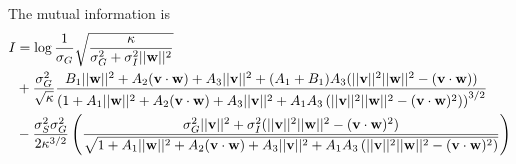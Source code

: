 \documentclass[11pt]{article}
\begin{document}
The mutual information is
\begin{align}
	I &= \log \frac{1}{\sigma_G} \sqrt{\frac{\kappa}{\sigma_G^2 + \sigma_I^2 ||\mathbf{w}||^2}} \notag \\
	&+ \frac{\sigma_G^2}{\sqrt{\kappa}} \frac{B_1 ||\mathbf{w}||^2 + A_2 (\mathbf{v}\cdot\mathbf{w}) + A_3 ||\mathbf{v}||^2 + (A_1 + B_1) A_3 (||\mathbf{v}||^2 ||\mathbf{w}||^2 - (\mathbf{v}\cdot\mathbf{w}))}{\left(1 + A_1 ||\mathbf{w}||^2 + A_2 (\mathbf{v}\cdot\mathbf{w}) + A_3 ||\mathbf{v}||^2 +A_1 A_3 \left(||\mathbf{v}||^2||\mathbf{w}||^2 - (\mathbf{v}\cdot\mathbf{w})^2\right)\right)^{3/2}} \\
	&-\frac{\sigma_S^2 \sigma_G^2}{2 \kappa^{3/2}} \left(\frac{\sigma_G^2 ||\mathbf{v}||^2 + \sigma_I^2(||\mathbf{v}||^2 ||\mathbf{w}||^2 - (\mathbf{v}\cdot \mathbf{w})^2)}{\sqrt{1 + A_1 ||\mathbf{w}||^2 + A_2 (\mathbf{v}\cdot\mathbf{w}) + A_3 ||\mathbf{v}||^2 +A_1 A_3 \left(||\mathbf{v}||^2||\mathbf{w}||^2 - (\mathbf{v}\cdot\mathbf{w})^2\right)}}\right)
\end{align}
\end{document}
